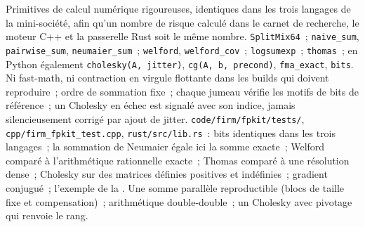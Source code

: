 \begin{build}
 Primitives de calcul numérique rigoureuses, identiques dans les trois langages de la mini-société, afin qu'un nombre de risque calculé dans le carnet de recherche, le moteur C++ et
la passerelle Rust soit le même nombre.
 \texttt{SplitMix64}~; \texttt{naive\_sum}, \texttt{pairwise\_sum}, \texttt{neumaier\_sum}~; \texttt{welford}, \texttt{welford\_cov}~; \texttt{logsumexp}~; \texttt{thomas}~; en Python également
\texttt{cholesky(A, jitter)}, \texttt{cg(A, b, precond)}, \texttt{fma\_exact}, \texttt{bits}.
 Ni fast-math, ni contraction en virgule flottante dans les builds qui doivent reproduire~; ordre de sommation fixe~; chaque jumeau vérifie les motifs de bits de référence~; un Cholesky en échec est signalé avec son
indice, jamais silencieusement corrigé par ajout de jitter.
 \texttt{code/firm/fpkit/tests/}, \texttt{cpp/firm\_fpkit\_test.cpp}, \texttt{rust/src/lib.rs}~: bits identiques dans les trois langages~; la sommation de Neumaier égale ici la somme exacte~;
Welford comparé à l'arithmétique rationnelle exacte~; Thomas comparé à une résolution dense~; Cholesky sur des matrices définies positives et indéfinies~; gradient conjugué~; l'exemple de la .
 Une somme parallèle reproductible (blocs de taille fixe et compensation)~; arithmétique double-double~; un Cholesky avec pivotage qui renvoie le rang.
\end{build}

